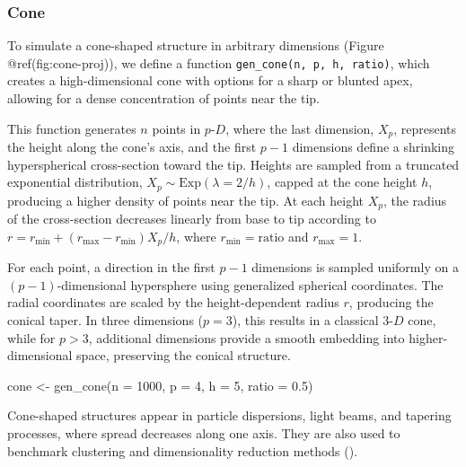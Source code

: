 \documentclass[
  11pt,
  a4paper,
]{report}
\newenvironment{Shaded}{\begin{snugshade}}{\end{snugshade}}
\newcommand{\AttributeTok}[1]{\textcolor[rgb]{0.40,0.45,0.13}{#1}}
\newcommand{\DecValTok}[1]{\textcolor[rgb]{0.68,0.00,0.00}{#1}}
\newcommand{\FloatTok}[1]{\textcolor[rgb]{0.68,0.00,0.00}{#1}}
\newcommand{\FunctionTok}[1]{\textcolor[rgb]{0.28,0.35,0.67}{#1}}
\newcommand{\NormalTok}[1]{\textcolor[rgb]{0.00,0.23,0.31}{#1}}
\newcommand{\OtherTok}[1]{\textcolor[rgb]{0.00,0.23,0.31}{#1}}
\begin{document}
\subsubsection{Cone}\label{cone}

To simulate a cone-shaped structure in arbitrary dimensions (Figure
@ref(fig:cone-proj)), we define a function
\texttt{gen\_cone(n,\ p,\ h,\ ratio)}, which creates a high-dimensional
cone with options for a sharp or blunted apex, allowing for a dense
concentration of points near the tip.

This function generates \(n\) points in \(p\text{-}D\), where the last
dimension, \(X_p\), represents the height along the cone's axis, and the
first \(p-1\) dimensions define a shrinking hyperspherical cross-section
toward the tip. Heights are sampled from a truncated exponential
distribution, \(X_p \sim \text{Exp}(\lambda = 2/h)\), capped at the cone
height \(h\), producing a higher density of points near the tip. At each
height \(X_p\), the radius of the cross-section decreases linearly from
base to tip according to
\(r = r_{\text{min}} + (r_{\text{max}} - r_{\text{min}}) X_p / h\),
where \(r_{\text{min}} = \text{ratio}\) and \(r_{\text{max}} = 1\).

For each point, a direction in the first \(p-1\) dimensions is sampled
uniformly on a \((p-1)\)-dimensional hypersphere using generalized
spherical coordinates. The radial coordinates are scaled by the
height-dependent radius \(r\), producing the conical taper. In three
dimensions (\(p = 3\)), this results in a classical \(3\text{-}D\) cone,
while for \(p > 3\), additional dimensions provide a smooth embedding
into higher-dimensional space, preserving the conical structure.

\begin{Shaded}
\begin{Highlighting}[]
\NormalTok{cone }\OtherTok{\textless{}{-}} \FunctionTok{gen\_cone}\NormalTok{(}\AttributeTok{n =} \DecValTok{1000}\NormalTok{, }\AttributeTok{p =} \DecValTok{4}\NormalTok{, }\AttributeTok{h =} \DecValTok{5}\NormalTok{, }\AttributeTok{ratio =} \FloatTok{0.5}\NormalTok{)}
\end{Highlighting}
\end{Shaded}

Cone-shaped structures appear in particle dispersions, light beams, and
tapering processes, where spread decreases along one axis. They are also
used to benchmark clustering and dimensionality reduction methods
().
\end{document}
